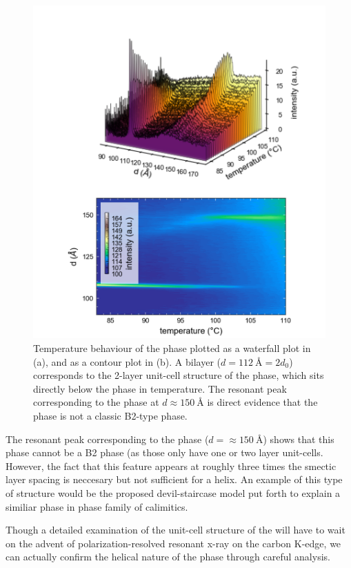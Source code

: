 \documentclass[aagreenthesis]{subfiles}
\begin{document}
\begin{figure}[h!]
    \centering
    \includegraphics[width=.8\textwidth]{figs/pal30/rsoxssm2/sm2-rsoxs.png}
    \caption{\label{fig:pal30:diffractVt} Temperature behaviour of the
    \smcpalpha{} phase plotted as a waterfall plot in (a), and as a contour plot
    in (b). A bilayer ($d=\SI{112}{\angstrom} =2d_0$) corresponds to the 2-layer
unit-cell structure of the \smcapa{} phase, which sits directly below the
\smcpalpha phase in temperature. The resonant peak corresponding to the
\smcpalpha{} phase at $d\approx\SI{150}{\angstrom}$ is direct evidence that the
\smcpalpha{} phase is not a classic B2-type phase.}
\end{figure}

The resonant peak corresponding to the \smcpalpha{} phase
($d=\approx\SI{150}{\angstrom}$) shows that this phase cannot be a B2 phase (as
those only have one or two layer unit-cells. However, the fact that this feature
appears at roughly three times the smectic layer spacing is neccesary but not
sufficient for a helix. An example of this type of structure would be the
proposed devil-staircase model put forth to explain a similiar phase in
\smcstar{} phase family of calimitics.

Though a detailed examination of the unit-cell structure of the \smcpalpha{}
will have to wait on the advent of polarization-resolved resonant x-ray on the
carbon K-edge, we can actually confirm the helical nature of the \smcpalpha{}
phase through careful analysis.
\end{document}
